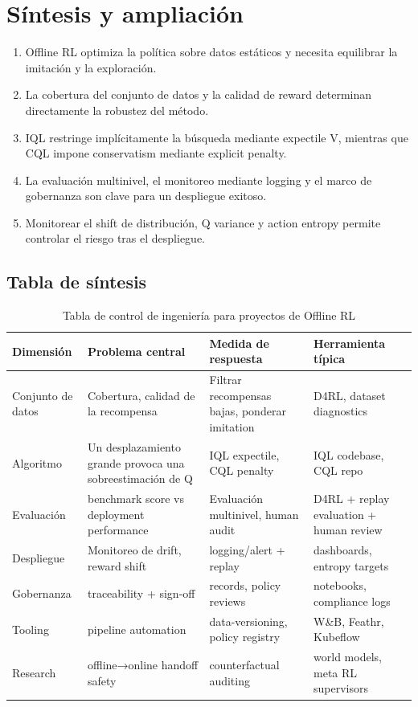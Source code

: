 \section{Síntesis y ampliación}

\begin{enumerate}
    \item Offline RL optimiza la política sobre datos estáticos y necesita equilibrar la imitación y la exploración.
    \item La cobertura del conjunto de datos y la calidad de reward determinan directamente la robustez del método.
    \item IQL restringe implícitamente la búsqueda mediante expectile V, mientras que CQL impone conservatism mediante explicit penalty.
    \item La evaluación multinivel, el monitoreo mediante logging y el marco de gobernanza son clave para un despliegue exitoso.
    \item Monitorear el shift de distribución, Q variance y action entropy permite controlar el riesgo tras el despliegue.
\end{enumerate}

\subsection{Tabla de síntesis}

\begin{table}[H]
\centering
\begin{tabular}{p{} p{} p{} p{}}
\toprule
Dimensión & Problema central & Medida de respuesta & Herramienta típica \\
\midrule
Conjunto de datos & Cobertura, calidad de la recompensa & Filtrar recompensas bajas, ponderar imitation & D4RL, dataset diagnostics \\
Algoritmo & Un desplazamiento grande provoca una sobreestimación de Q & IQL expectile, CQL penalty & IQL codebase, CQL repo \\
Evaluación & benchmark score vs deployment performance & Evaluación multinivel, human audit & D4RL + replay evaluation + human review \\
Despliegue & Monitoreo de drift, reward shift & logging/alert + replay & dashboards, entropy targets \\
Gobernanza & traceability + sign-off & records, policy reviews & notebooks, compliance logs \\
Tooling & pipeline automation & data-versioning, policy registry & W\&B, Feathr, Kubeflow \\
Research & offline→online handoff safety & counterfactual auditing & world models, meta RL supervisors \\
\bottomrule
\end{tabular}
\caption{Tabla de control de ingeniería para proyectos de Offline RL}
\end{table}

